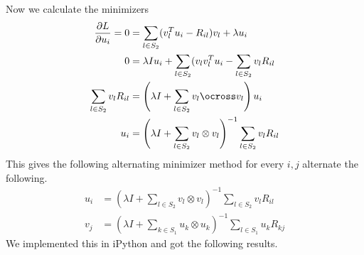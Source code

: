 \documentclass[letter]{article}
\newenvironment{menumerate}{%
  \edef\backupindent{\the\parindent}%
  \enumerate%
  \setlength{\parindent}{\backupindent}%
}{\endenumerate}
\begin{document}
\begin{menumerate}
\begin{menumerate}
  Now we calculate the minimizers
  \begin{equation*}
  \begin{aligned}
   \frac{\partial L}{\partial u_i} = 0 &= \sum_{l \in S_2} (v_l^Tu_i - R_{il})v_l + \lambda u_i \\
   0 &= \lambda I u_i + \sum_{l \in S_2} (v_lv_l^Tu_i -  \sum_{l \in S_2}  v_lR_{il}  \\
   \sum_{l \in S_2}  v_lR_{il} &= \left(\lambda I + \sum_{l \in S_2} v_l\ocross v_l\right) u_i \\
   u_i &= \left(\lambda I + \sum_{l \in S_2} v_l\otimes v_l\right)^{-1} \sum_{l \in S_2}  v_lR_{il}
  \end{aligned}
  \end{equation*}
  This gives the following alternating minimizer method for every $i,j$ alternate the following.
  \begin{equation}
  \begin{aligned}
       u_i &= \left(\lambda I + \sum_{l \in S_2} v_l\otimes v_l\right)^{-1} \sum_{l \in S_2}  v_lR_{il} \\
       v_j &= \left(\lambda I + \sum_{k \in S_1} u_k\otimes u_k\right)^{-1} \sum_{l \in S_1}  u_kR_{kj}
    \end{aligned}  
  \end{equation}
  We implemented this in iPython and got the following results.
  \end{menumerate}
\end{menumerate}
\end{document}
